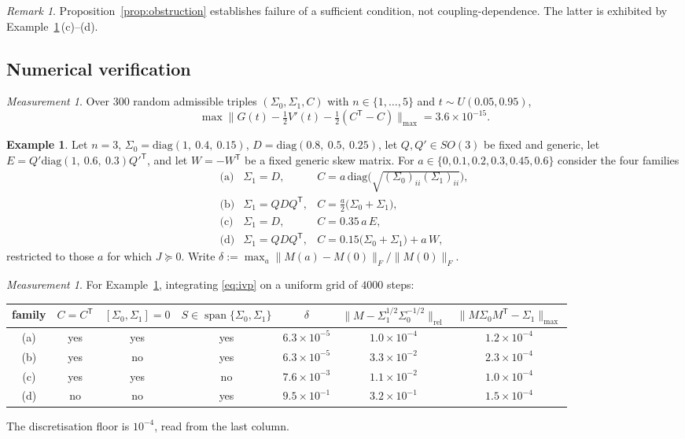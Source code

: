 \documentclass[11pt]{article}
\theoremstyle{definition}
\newtheorem{example}[lemma]{Example}
\theoremstyle{remark}
\newtheorem{remark}[lemma]{Remark}
\newtheorem{measurement}[lemma]{Measurement}
\DeclareMathOperator{\spn}{span}
\newcommand{\T}{\mathsf{T}}
\begin{document}
\begin{remark}\label{rem:obstrscope}
Proposition~\ref{prop:obstruction} establishes failure of a sufficient condition, not
coupling-dependence. The latter is exhibited by Example~\ref{ex:arms}\,(c)--(d).
\end{remark}

\subsection{Numerical verification}

\begin{measurement}\label{meas:id}
Over $300$ random admissible triples $(\Sigma_0,\Sigma_1,C)$ with $n\in\{1,\dots,5\}$ and
$t\sim U(0.05,0.95)$,
\[
\max\big\|G(t)-\tfrac12V'(t)-\tfrac12(C^{\T}-C)\big\|_{\max}=3.6\times10^{-15}.
\]
\end{measurement}

\begin{example}\label{ex:arms}
Let $n=3$, $\Sigma_0=\mathrm{diag}(1,\ 0.4,\ 0.15)$, $D=\mathrm{diag}(0.8,\ 0.5,\ 0.25)$, let
$Q,Q'\in SO(3)$ be fixed and generic, let $E=Q'\mathrm{diag}(1,\ 0.6,\ 0.3)Q'^{\T}$, and let
$W=-W^{\T}$ be a fixed generic skew matrix. For $a\in\{0,0.1,0.2,0.3,0.45,0.6\}$ consider the four
families
\[
\begin{array}{llll}
\text{(a)} & \Sigma_1=D, & C=a\,\mathrm{diag}\big(\sqrt{(\Sigma_0)_{ii}(\Sigma_1)_{ii}}\big), \\[2pt]
\text{(b)} & \Sigma_1=QDQ^{\T}, & C=\tfrac{a}{2}\big(\Sigma_0+\Sigma_1\big), \\[2pt]
\text{(c)} & \Sigma_1=D, & C=0.35\,a\,E, \\[2pt]
\text{(d)} & \Sigma_1=QDQ^{\T}, & C=0.15\big(\Sigma_0+\Sigma_1\big)+a\,W,
\end{array}
\]
restricted to those $a$ for which $J\succeq0$. Write
$\delta:=\max_a\|M(a)-M(0)\|_F/\|M(0)\|_F$.
\end{example}

\begin{measurement}\label{meas:arms}
For Example~\ref{ex:arms}, integrating \eqref{eq:ivp} on a uniform grid of $4000$ steps:
\begin{center}
\begin{tabular}{ccccccc}
\toprule
family & $C=C^{\T}$ & $[\Sigma_0,\Sigma_1]=0$ & $S\in\spn\{\Sigma_0,\Sigma_1\}$ & $\delta$ &
$\|M-\Sigma_1^{1/2}\Sigma_0^{-1/2}\|_{\mathrm{rel}}$ & $\|M\Sigma_0M^{\T}-\Sigma_1\|_{\max}$\\
\midrule
(a) & yes & yes & yes & $6.3\times10^{-5}$ & $1.0\times10^{-4}$ & $1.2\times10^{-4}$\\
(b) & yes & no  & yes & $6.3\times10^{-5}$ & $3.3\times10^{-2}$ & $2.3\times10^{-4}$\\
(c) & yes & yes & no  & $7.6\times10^{-3}$ & $1.1\times10^{-2}$ & $1.0\times10^{-4}$\\
(d) & no  & no  & yes & $9.5\times10^{-1}$ & $3.2\times10^{-1}$ & $1.5\times10^{-4}$\\
\bottomrule
\end{tabular}
\end{center}
The discretisation floor is $10^{-4}$, read from the last column.
\end{measurement}
\end{document}
